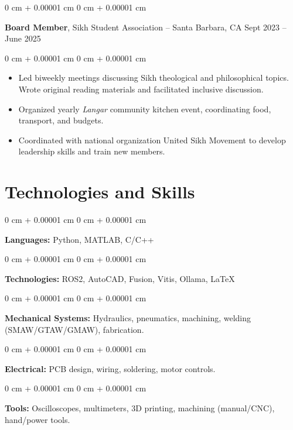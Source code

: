 \documentclass[10pt, letterpaper]{article}
\newenvironment{highlights}{
    \begin{itemize}[
        topsep=0.10 cm,
        parsep=0.10 cm,
        partopsep=0pt,
        itemsep=0pt,
        leftmargin=0 cm + 10pt
    ]
}{
    \end{itemize}
} %
\newenvironment{onecolentry}{
    \begin{adjustwidth}{
        0 cm + 0.00001 cm
    }{
        0 cm + 0.00001 cm
    }
}{
    \end{adjustwidth}
} %
\newenvironment{twocolentry}[2][]{
    \onecolentry
    \def\secondColumn{#2}
    \setcolumnwidth{\fill, 4.5 cm}
    \begin{paracol}{2}
}{
    \switchcolumn \raggedleft \secondColumn
    \end{paracol}
    \endonecolentry
} %
\begin{document}
        \begin{twocolentry}{
            Sept 2023 – June 2025
        }
            \textbf{Board Member}, Sikh Student Association -- Santa Barbara, CA \end{twocolentry}

        \vspace{0.10 cm}
        \begin{onecolentry}
            \begin{highlights}
                \item Led biweekly meetings discussing Sikh theological and philosophical topics. Wrote original reading materials and facilitated  inclusive discussion.
                \item Organized yearly \textit{Langar} community kitchen event, coordinating food, transport, and budgets.
                \item Coordinated with national organization United Sikh Movement to develop leadership skills and train new members.
            \end{highlights}
        \end{onecolentry}

    \section{Technologies and Skills}

        \begin{onecolentry}
            \textbf{Languages:} Python, MATLAB, C/C++
        \end{onecolentry}

        \vspace{0.1 cm}

        \begin{onecolentry}
            \textbf{Technologies:} ROS2, AutoCAD, Fusion, Vitis, Ollama, \LaTeX
        \end{onecolentry}
        
        \vspace{0.1 cm}

        \begin{onecolentry}
            \textbf{Mechanical Systems:} Hydraulics, pneumatics, machining, welding (SMAW/GTAW/GMAW), fabrication. 
        \end{onecolentry}

        \vspace{0.1 cm}

        \begin{onecolentry}
            \textbf{Electrical:} PCB design, wiring, soldering, motor controls.
        \end{onecolentry}

        \vspace{0.1 cm}

        \begin{onecolentry}
            \textbf{Tools:} Oscilloscopes, multimeters, 3D printing, machining (manual/CNC), hand/power tools.
        \end{onecolentry}
\end{document}
